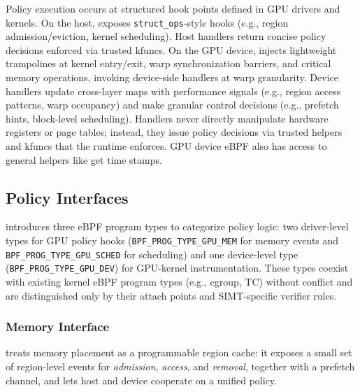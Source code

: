 Policy execution occurs at structured hook points defined in GPU drivers and kernels. On the host, \sysdriver exposes \texttt{struct\_ops}-style hooks (e.g., region admission/eviction, kernel scheduling). Host handlers return concise policy decisions enforced via trusted kfuncs. On the GPU device, \sys injects lightweight trampolines at kernel entry/exit, warp synchronization barriers, and critical memory operations, invoking device-side handlers at warp granularity. Device handlers update cross-layer maps with performance signals (e.g., region access patterns, warp occupancy) and make granular control decisions (e.g., prefetch hints, block-level scheduling). Handlers never directly manipulate hardware registers or page tables; instead, they issue policy decisions via trusted helpers and kfuncs that the runtime enforces. GPU device eBPF also has access to general helpers like get time stamps.


\subsection{Policy Interfaces}
\label{sec:design-interfaces}

\sys introduces three eBPF program types to categorize policy logic:
two driver-level types for GPU policy hooks (\texttt{BPF\_PROG\_TYPE\_GPU\_MEM} for memory events and \texttt{BPF\_PROG\_TYPE\_GPU\_SCHED} for scheduling) and one device-level type (\texttt{BPF\_PROG\_TYPE\_GPU\_DEV}) for GPU-kernel instrumentation. These types coexist with existing kernel eBPF program types (e.g., cgroup, TC) without conflict and are distinguished only by their attach points and SIMT-specific verifier rules.

\subsubsection{Memory Interface}
\label{sec:design-mem}

\sys treats memory placement as a programmable region
cache: it exposes a small set of region-level events for \emph{admission},
\emph{access}, and \emph{removal}, together with a prefetch channel, and lets host
and device cooperate on a unified policy.

